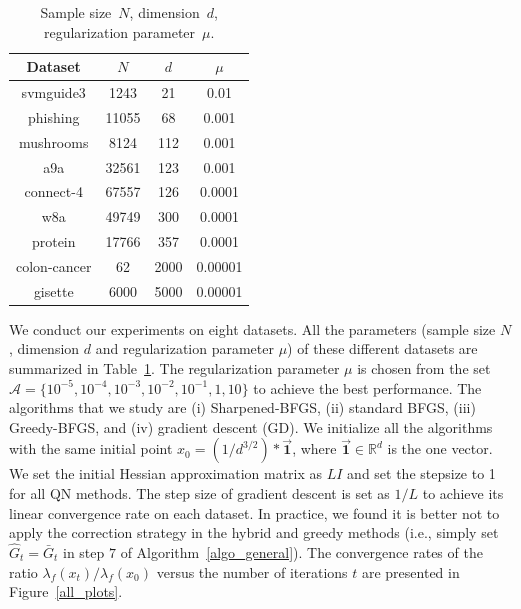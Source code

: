 \documentclass[11pt]{article}
\numberwithin{assumption}{section}
\numberwithin{remark}{section}
\numberwithin{theorem}{section}
\begin{document}
\begin{table}[t]
  \centering
  \begin{tabular}{ |c|c|c|c| }
    \hline
    Dataset & $N$ & $d$ & $\mu$ \\
    \hline
    \hline
    svmguide3 & 1243 & 21 & 0.01 \\
    \hline
    phishing & 11055 & 68 & 0.001 \\
    \hline
    mushrooms & 8124 & 112 & 0.001 \\
    \hline
    a9a & 32561 & 123 & 0.001 \\
    \hline
    connect-4 & 67557 & 126 & 0.0001 \\
    \hline
    w8a & 49749& 300 & 0.0001 \\
    \hline
    protein & 17766 & 357 & 0.0001 \\
    \hline
    colon-cancer & 62 & 2000 & 0.00001 \\
    \hline
    gisette & 6000 & 5000 & 0.00001 \\
    \hline
  \end{tabular}
  \caption{Sample size~$N$, dimension~$d$, regularization parameter~$\mu$.}
  \label{tab_2}
\end{table}

We conduct our experiments on eight datasets. All the parameters (sample size $N$, dimension $d$ and regularization parameter $\mu$) of these different datasets are summarized in Table~\ref{tab_2}. The regularization parameter $\mu$ is chosen from the set $
\mathcal{A} = \{10^{-5}, 10^{-4}, 10^{-3}, 10^{-2}, 10^{-1}, 1, 10\}$
to achieve the best performance. The algorithms that we study are (i) Sharpened-BFGS, (ii) standard BFGS, (iii) Greedy-BFGS, and (iv) gradient descent (GD). We initialize all the algorithms with the same initial point $x_0 = (1/d^{3/2})*\vec{\mathbf{1}}$, where $\vec{\mathbf{1}} \in \mathbb{R}^d$ is the one vector.  We set the initial Hessian approximation matrix as $LI$ and set the stepsize to 1 for all QN methods.  The step size of gradient descent is set as $1/L$ to achieve its linear convergence rate on each dataset. In practice, we found it is better not to apply the correction strategy in the hybrid and greedy methods (i.e., simply set $\hat{G}_t = \bar{G}_t$ in step $7$ of Algorithm~\ref{algo_general}). The convergence rates of the ratio ${\lambda_{f}(x_t)}/{\lambda_{f}(x_0)}$ versus the number of iterations $t$ are presented in Figure~\ref{all_plots}.
\end{document}
